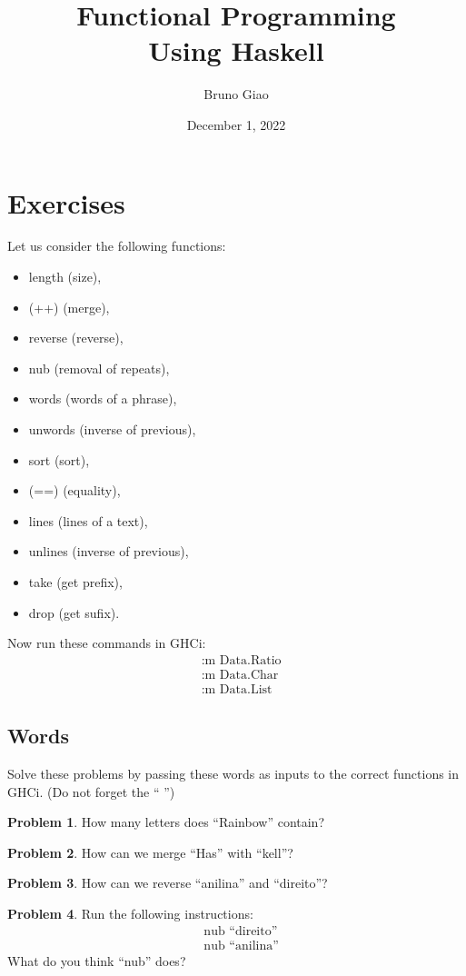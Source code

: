 \documentclass[a4paper,10pt]{article}
\title{Functional Programming \\ Using Haskell}
\author{Bruno Giao}
\date{December 1, 2022}
\theoremstyle{definition}
\newtheorem{problem}{Problem}[section]
\begin{document}
\maketitle

\section{Exercises}
Let us consider the following functions:
\begin{itemize}
    \item{length} (size),
    \item{(++)} (merge),
    \item{reverse} (reverse),
    \item{nub} (removal of repeats),
    \item{words} (words of a phrase),
    \item{unwords} (inverse of previous),
    \item{sort} (sort),
    \item{(==)} (equality),
    \item{lines} (lines of a text),
    \item{unlines} (inverse of previous),
    \item{take} (get prefix),
    \item{drop} (get sufix).
\end{itemize}
Now run these commands in GHCi:
\begin{align*}
    &\text{:m Data.Ratio}\\
    &\text{:m Data.Char}\\
    &\text{:m Data.List}
\end{align*}
\subsection*{Words}
Solve these problems by passing these words as inputs
to the correct functions in GHCi. (Do not forget the `` '')
\begin{problem}
    How many letters does ``Rainbow'' contain?
\end{problem}
\begin{problem}
    How can we merge ``Has'' with ``kell''?
\end{problem}
\begin{problem}
    How can we reverse ``anilina'' and ``direito''?
\end{problem}

\begin{problem}
    Run the following instructions:
    \begin{align*}
        &\text{nub ``direito''}\\
        &\text{nub ``anilina''}
    \end{align*}
    What do you think ``nub'' does?
\end{problem}
\end{document}
